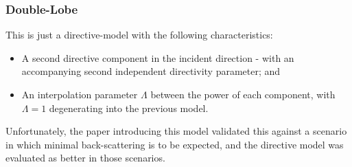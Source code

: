 \documentclass[lettersize,journal]{IEEEtran}
\begin{document}
\subsubsection{Double-Lobe} \label{doubleLobe}
This is just a directive-model with the following characteristics:
\begin{itemize}
    \item A second directive component in the incident direction - with an accompanying second independent directivity parameter; and
    \item An interpolation parameter $\Lambda$ between the power of each component, with $\Lambda=1$ degenerating into the previous model.
\end{itemize}

Unfortunately, the paper introducing this model \cite{ref:degliThird} validated this against a scenario in which minimal back-scattering is to be expected, and the directive model was evaluated as better in those scenarios.
\end{document}
